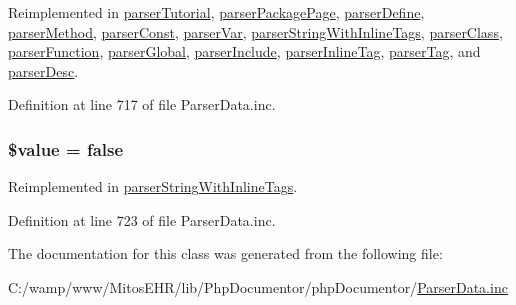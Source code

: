 \-Reimplemented in \hyperlink{classparser_tutorial_a9a4a6fba2208984cabb3afacadf33919}{parser\-Tutorial}, \hyperlink{classparser_package_page_a9a4a6fba2208984cabb3afacadf33919}{parser\-Package\-Page}, \hyperlink{classparser_define_a9a4a6fba2208984cabb3afacadf33919}{parser\-Define}, \hyperlink{classparser_method_a9a4a6fba2208984cabb3afacadf33919}{parser\-Method}, \hyperlink{classparser_const_a9a4a6fba2208984cabb3afacadf33919}{parser\-Const}, \hyperlink{classparser_var_a9a4a6fba2208984cabb3afacadf33919}{parser\-Var}, \hyperlink{classparser_string_with_inline_tags_a9a4a6fba2208984cabb3afacadf33919}{parser\-String\-With\-Inline\-Tags}, \hyperlink{classparser_class_a9a4a6fba2208984cabb3afacadf33919}{parser\-Class}, \hyperlink{classparser_function_a9a4a6fba2208984cabb3afacadf33919}{parser\-Function}, \hyperlink{classparser_global_a9a4a6fba2208984cabb3afacadf33919}{parser\-Global}, \hyperlink{classparser_include_a9a4a6fba2208984cabb3afacadf33919}{parser\-Include}, \hyperlink{classparser_inline_tag_a9a4a6fba2208984cabb3afacadf33919}{parser\-Inline\-Tag}, \hyperlink{classparser_tag_a9a4a6fba2208984cabb3afacadf33919}{parser\-Tag}, and \hyperlink{classparser_desc_a9a4a6fba2208984cabb3afacadf33919}{parser\-Desc}.



\-Definition at line 717 of file \-Parser\-Data.\-inc.

\hypertarget{classparser_base_a0f298096f322952a72a50f98a74c7b60}{
\subsubsection[{\$value}]{\setlength{\rightskip}{0pt plus 5cm}\$value = false}}\label{classparser_base_a0f298096f322952a72a50f98a74c7b60}


\-Reimplemented in \hyperlink{classparser_string_with_inline_tags_a0f298096f322952a72a50f98a74c7b60}{parser\-String\-With\-Inline\-Tags}.



\-Definition at line 723 of file \-Parser\-Data.\-inc.



\-The documentation for this class was generated from the following file\-:\begin{DoxyCompactItemize}
\item 
\-C\-:/wamp/www/\-Mitos\-E\-H\-R/lib/\-Php\-Documentor/php\-Documentor/\hyperlink{_parser_data_8inc}{\-Parser\-Data.\-inc}\end{DoxyCompactItemize}
